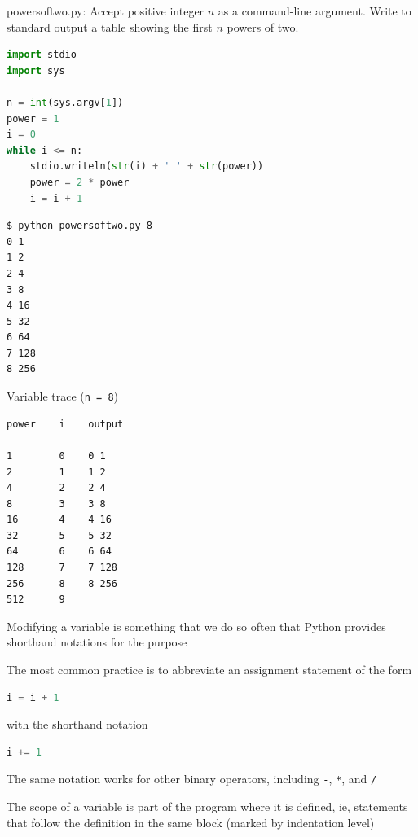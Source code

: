 \documentclass[8pt,a4paper,compress]{beamer}
\begin{document}
\begin{frame}[fragile]
\pause

\begin{framed}
\tiny powersoftwo.py: Accept positive integer $n$ as a command-line argument. Write to standard output a table showing the first $n$ powers of two.
\end{framed}

\begin{lstlisting}[language=Python]
import stdio
import sys

n = int(sys.argv[1])
power = 1
i = 0
while i <= n:
    stdio.writeln(str(i) + ' ' + str(power))    
    power = 2 * power
    i = i + 1
\end{lstlisting}

\pause

\begin{minipage}{150pt}
\begin{lstlisting}[language={}]
$ python powersoftwo.py 8
0 1
1 2
2 4
3 8
4 16
5 32
6 64
7 128
8 256
\end{lstlisting}
\end{minipage}\hfill
\begin{minipage}{100pt}
Variable trace (\lstinline{n = 8})
\begin{lstlisting}[language={}]
power    i    output
--------------------
1        0    0 1
2        1    1 2
4        2    2 4
8        3    3 8
16       4    4 16
32       5    5 32
64       6    6 64
128      7    7 128
256      8    8 256
512      9
\end{lstlisting}
\end{minipage}
\end{frame}

\begin{frame}[fragile]
\pause

Modifying a variable is something that we do so often that Python provides shorthand notations for the purpose

\pause
\bigskip

The most common practice is to abbreviate an assignment statement of the form 

\begin{lstlisting}[language=Python]
i = i + 1
\end{lstlisting}

with the shorthand notation

\begin{lstlisting}[language=Python]
i += 1
\end{lstlisting}

\pause
\bigskip

The same notation works for other binary operators, including \lstinline{-}, \lstinline{*}, and \lstinline{/}

\pause
\bigskip

The scope of a variable is part of the program where it is defined, ie, statements that follow the definition in the same block (marked by indentation level)
\end{frame}
\end{document}
